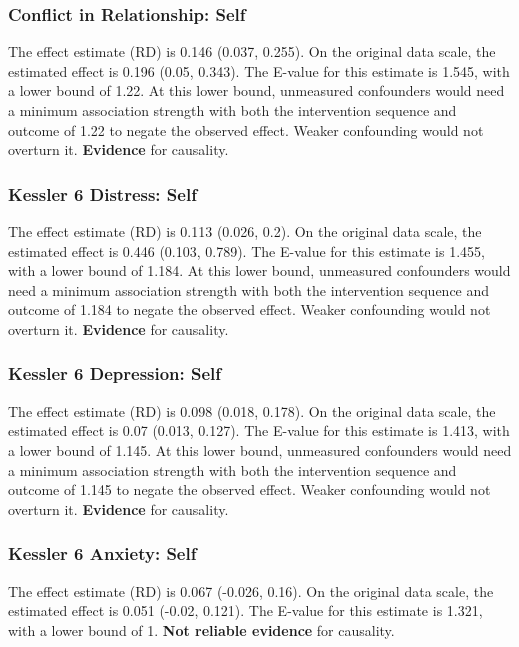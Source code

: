 \documentclass[
  singlecolumn]{article}
\begin{document}
\subsubsection{Conflict in Relationship:
Self}\label{conflict-in-relationship-self-17}

The effect estimate (RD) is 0.146 (0.037, 0.255). On the original data
scale, the estimated effect is 0.196 (0.05, 0.343). The E-value for this
estimate is 1.545, with a lower bound of 1.22. At this lower bound,
unmeasured confounders would need a minimum association strength with
both the intervention sequence and outcome of 1.22 to negate the
observed effect. Weaker confounding would not overturn it.
\textbf{Evidence} for causality.

\subsubsection{Kessler 6 Distress:
Self}\label{kessler-6-distress-self-17}

The effect estimate (RD) is 0.113 (0.026, 0.2). On the original data
scale, the estimated effect is 0.446 (0.103, 0.789). The E-value for
this estimate is 1.455, with a lower bound of 1.184. At this lower
bound, unmeasured confounders would need a minimum association strength
with both the intervention sequence and outcome of 1.184 to negate the
observed effect. Weaker confounding would not overturn it.
\textbf{Evidence} for causality.

\subsubsection{Kessler 6 Depression:
Self}\label{kessler-6-depression-self-17}

The effect estimate (RD) is 0.098 (0.018, 0.178). On the original data
scale, the estimated effect is 0.07 (0.013, 0.127). The E-value for this
estimate is 1.413, with a lower bound of 1.145. At this lower bound,
unmeasured confounders would need a minimum association strength with
both the intervention sequence and outcome of 1.145 to negate the
observed effect. Weaker confounding would not overturn it.
\textbf{Evidence} for causality.

\subsubsection{Kessler 6 Anxiety: Self}\label{kessler-6-anxiety-self-17}

The effect estimate (RD) is 0.067 (-0.026, 0.16). On the original data
scale, the estimated effect is 0.051 (-0.02, 0.121). The E-value for
this estimate is 1.321, with a lower bound of 1. \textbf{Not reliable
evidence} for causality.
\end{document}
